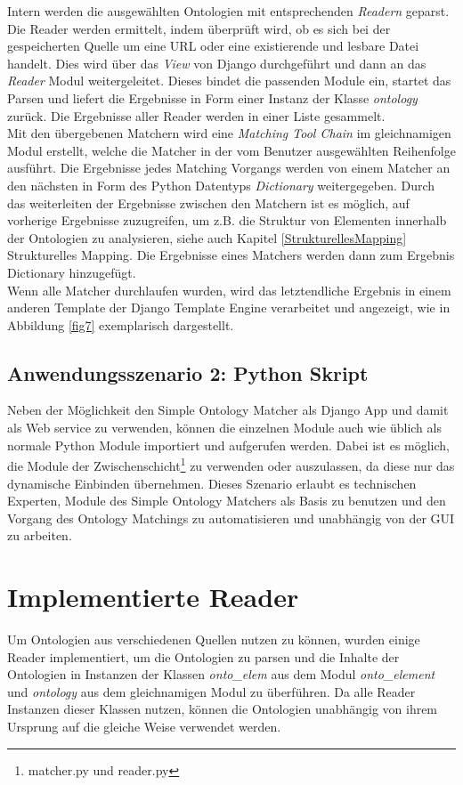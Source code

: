 		Intern werden die ausgewählten Ontologien mit entsprechenden
		\textit{Readern} geparst. Die Reader werden ermittelt, indem überprüft wird,
		ob es sich bei der gespeicherten Quelle um eine URL oder eine
		existierende und lesbare Datei handelt. Dies wird über das \textit{View} von
		Django durchgeführt und dann an das \textit{Reader} Modul weitergeleitet. Dieses
		bindet die passenden Module ein, startet das Parsen und liefert die Ergebnisse
		in Form einer Instanz der Klasse \textit{ontology} zurück. Die Ergebnisse
		aller Reader werden in einer Liste gesammelt.\\
		Mit den übergebenen Matchern wird eine \textit{Matching Tool Chain} im
		gleichnamigen Modul erstellt, welche die Matcher in der vom
		Benutzer ausgewählten Reihenfolge ausführt. Die Ergebnisse jedes Matching
		Vorgangs werden von einem Matcher an den nächsten in Form des Python Datentyps \textit{Dictionary}
		weitergegeben. Durch das weiterleiten der Ergebnisse zwischen den Matchern
		ist es möglich, auf vorherige Ergebnisse zuzugreifen, um z.B. die Struktur von
		Elementen innerhalb der Ontologien zu analysieren,
		siehe auch Kapitel \ref{StrukturellesMapping} Strukturelles Mapping.
		Die Ergebnisse eines Matchers werden dann zum Ergebnis Dictionary
		hinzugefügt.\\
		Wenn alle Matcher durchlaufen wurden, wird das letztendliche Ergebnis in einem
		anderen Template der Django Template Engine verarbeitet und angezeigt,
		wie in Abbildung \ref{fig7} exemplarisch dargestellt.
		
		\subsection{Anwendungsszenario 2: Python Skript}
		Neben der Möglichkeit den Simple Ontology Matcher als Django App und damit als
		Web service zu verwenden, können die einzelnen Module auch wie üblich als
		normale Python Module importiert und aufgerufen werden. Dabei ist es möglich, die Module der
		Zwischenschicht\footnote{matcher.py und reader.py} zu verwenden oder
		auszulassen, da diese nur das dynamische Einbinden übernehmen. Dieses
		Szenario erlaubt es technischen Experten, Module des Simple Ontology Matchers
		als Basis zu benutzen und den Vorgang des Ontology Matchings zu
		automatisieren und unabhängig von der GUI zu arbeiten.
		
		\section{Implementierte Reader}
		Um Ontologien aus verschiedenen Quellen nutzen zu können, wurden einige Reader
		implementiert, um die Ontologien zu parsen und die Inhalte der Ontologien in
		Instanzen der Klassen \textit{onto\_elem} aus dem Modul \textit{onto\_element}
		und \textit{ontology} aus dem gleichnamigen Modul zu überführen. Da alle
		Reader Instanzen dieser Klassen nutzen, können die Ontologien unabhängig von
		ihrem Ursprung auf die gleiche Weise verwendet werden.
		
